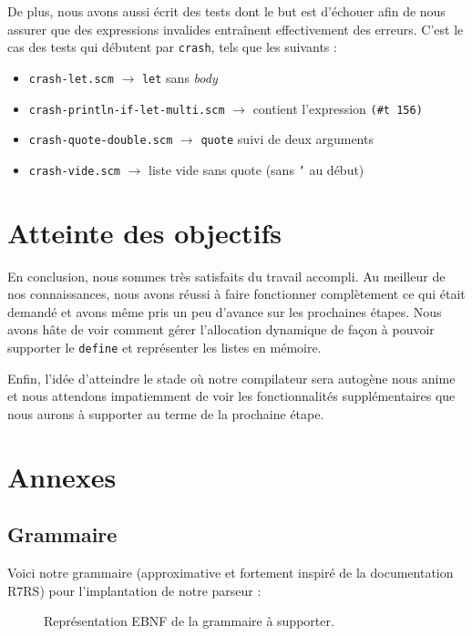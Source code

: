 \documentclass[12pt]{article}
\begin{document}
De plus, nous avons aussi écrit des tests dont le but est d'échouer afin de nous assurer que des expressions invalides entraînent effectivement des erreurs. C'est le cas des tests qui débutent par \texttt{crash}, tels que les suivants :

\begin{itemize}
\item \texttt{crash-let.scm} $\rightarrow$ \texttt{let} sans \textit{body}
\item \texttt{crash-println-if-let-multi.scm} $\rightarrow$ contient l'expression \texttt{(\#t 156)}
\item \texttt{crash-quote-double.scm} $\rightarrow$ \texttt{quote} suivi de deux arguments
\item \texttt{crash-vide.scm} $\rightarrow$ liste vide sans quote (sans \texttt{'} au début)
\end{itemize}

\section{Atteinte des objectifs}
En conclusion, nous sommes très satisfaits du travail accompli. Au meilleur de nos connaissances, nous avons réussi à faire fonctionner complètement ce qui était demandé et avons même pris un peu d'avance sur les prochaines étapes. Nous avons hâte de voir comment gérer l'allocation dynamique de façon à pouvoir supporter le \texttt{define} et représenter les listes en mémoire.

Enfin, l'idée d'atteindre le stade où notre compilateur sera autogène nous anime et nous attendons impatiemment de voir les fonctionnalités supplémentaires que nous aurons à supporter au terme de la prochaine étape.

\newpage

\section{Annexes}

\subsection{Grammaire}
Voici notre grammaire (approximative et fortement inspiré de la documentation R7RS) pour l'implantation de notre parseur :
\begin{figure}[h!]
  
  \caption{Représentation EBNF de la grammaire à supporter.}
\end{figure}
\end{document}
